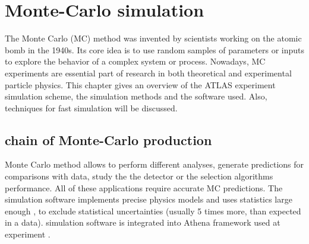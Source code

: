 
\chapter{Monte-Carlo simulation}\label{chap:MC}
\minitoc
The Monte Carlo (MC) method was invented by scientists working on the atomic bomb in the 1940s. Its core idea is to use random samples of parameters or inputs to explore the behavior of a complex system or process.  Nowadays, MC experiments are essential part of research in both theoretical and experimental particle physics.
This chapter gives an overview of the ATLAS experiment simulation scheme, the simulation methods and the software used. Also, techniques for fast simulation will be discussed. 

\section{\atlas chain of Monte-Carlo production}

\begin{figure}[!b]
\end{figure}

Monte Carlo method allows to perform different analyses, generate predictions for comparisons with data, study the the detector or the selection algorithms performance. All of these applications require accurate MC predictions. The simulation software implements precise physics models and uses statistics large enough , to exclude statistical uncertainties (usually 5 times more, than expected in a data). \atlas simulation software is integrated into Athena framework used at \atlas experiment \cite{Athena}. 

